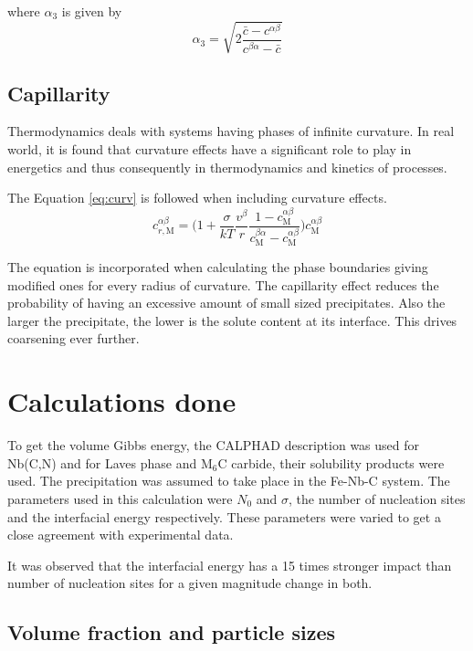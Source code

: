 \documentclass[12pt]{article}
\begin{document}
where $\alpha_3$ is given by
\begin{equation}
\alpha_3=\sqrt{2\frac{\bar{c}-c^{\alpha \beta}}{c^{\beta \alpha}-\bar{c}}}
\label{eq:zzz}
\end{equation}

\subsection{Capillarity}

Thermodynamics deals with systems having phases of infinite curvature. In real world, it is found that curvature effects have a significant role to play in energetics and thus consequently in thermodynamics and kinetics of processes.

The Equation \ref{eq:curv} is followed when including curvature effects.
\begin{equation}
c_{r,\mathrm{M}}^{\alpha \beta}=\bigg(1+\frac{\sigma}{kT}\frac{v^\beta}{r}\frac{1-c_{\mathrm{M}}^{\alpha \beta}}{c_{\mathrm{M}}^{\beta \alpha}-c_{\mathrm{M}}^{\alpha \beta}}\bigg)c_{\mathrm{M}}^{\alpha \beta}
\label{eq:curv}
\end{equation}

The equation is incorporated when calculating the phase boundaries giving modified ones for every radius of curvature.
The capillarity effect reduces the probability of having an excessive amount of small sized precipitates. Also the larger the precipitate, the lower is the solute content at its interface. This drives coarsening ever further.

\section{Calculations done}

To get the volume Gibbs energy, the CALPHAD description was used for Nb(C,N) and for Laves phase and M$_6$C carbide, their solubility products were used. The precipitation was assumed to take place in the Fe-Nb-C system. The parameters used in this calculation were $N_0$ and $\sigma$, the number of nucleation sites and the interfacial energy respectively. These parameters were varied to get a close agreement with experimental data.

It was observed that the interfacial energy has a 15 times stronger impact than number of nucleation sites for a given magnitude change in both.

\subsection{Volume fraction and particle sizes}
\end{document}
